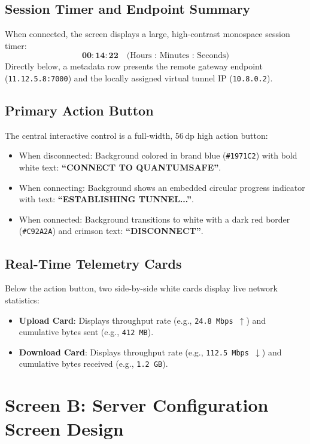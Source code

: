 \subsection{Session Timer and Endpoint Summary}
When connected, the screen displays a large, high-contrast monospace session timer:
\begin{equation}
\mathbf{00:14:22} \quad \text{(Hours : Minutes : Seconds)}
\end{equation}
Directly below, a metadata row presents the remote gateway endpoint (\texttt{11.12.5.8:7000}) and the locally assigned virtual tunnel IP (\texttt{10.8.0.2}).

\subsection{Primary Action Button}
The central interactive control is a full-width, 56\,dp high action button:
\begin{itemize}
    \item When disconnected: Background colored in brand blue (\texttt{\#1971C2}) with bold white text: \textbf{``CONNECT TO QUANTUMSAFE''}.
    \item When connecting: Background shows an embedded circular progress indicator with text: \textbf{``ESTABLISHING TUNNEL...''}.
    \item When connected: Background transitions to white with a dark red border (\texttt{\#C92A2A}) and crimson text: \textbf{``DISCONNECT''}.
\end{itemize}

\subsection{Real-Time Telemetry Cards}
Below the action button, two side-by-side white cards display live network statistics:
\begin{itemize}
    \item \textbf{Upload Card}: Displays throughput rate (e.g., \texttt{24.8 Mbps $\uparrow$}) and cumulative bytes sent (e.g., \texttt{412 MB}).
    \item \textbf{Download Card}: Displays throughput rate (e.g., \texttt{112.5 Mbps $\downarrow$}) and cumulative bytes received (e.g., \texttt{1.2 GB}).
\end{itemize}

\section{Screen B: Server Configuration Screen Design}
\label{sec:screen_server_config_design}

